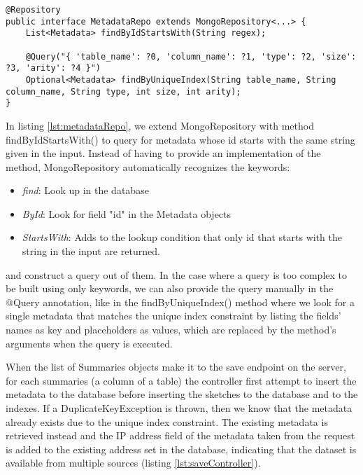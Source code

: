 \begin{lstlisting}[caption=Example of the the repository interface for collection of metadata, label=lst:metadataRepo]
@Repository
public interface MetadataRepo extends MongoRepository<...> {
    List<Metadata> findByIdStartsWith(String regex);
    
    @Query("{ 'table_name': ?0, 'column_name': ?1, 'type': ?2, 'size': ?3, 'arity': ?4 }")
    Optional<Metadata> findByUniqueIndex(String table_name, String column_name, String type, int size, int arity);
}
\end{lstlisting}

In listing \ref{lst:metadataRepo}, we extend MongoRepository with method findByIdStartsWith() to query for metadata whose id starts with the same string given in the input. Instead of having to provide an implementation of the method, MongoRepository automatically recognizes the keywords:

\begin{itemize}
    \item \textit{find}: Look up in the database
    \item \textit{ById}: Look for field "id" in the Metadata objects
    \item \textit{StartsWith}: Adds to the lookup condition that only id that starts with the string in the input are returned.
\end{itemize}

and construct a query out of them. In the case where a query is too complex to be built using only keywords, we can also provide the query manually in the @Query annotation, like in the findByUniqueIndex() method where we look for a single metadata that matches the unique index constraint by listing the fields' names as key and placeholders as values, which are replaced by the method's arguments when the query is executed.

When the list of Summaries objects make it to the save endpoint on the server, for each summaries (a column of a table) the controller first attempt to insert the metadata to the database before inserting the sketches to the database and to the indexes. If a DuplicateKeyException is thrown, then we know that the metadata already exists due to the unique index constraint. The existing metadata is retrieved instead and the IP address field of the metadata taken from the request is added to the existing address set in the database, indicating that the dataset is available from multiple sources (listing \ref{lst:saveController}).

